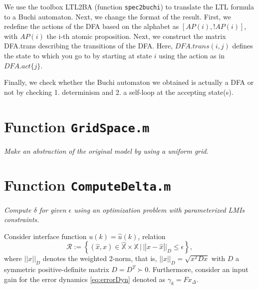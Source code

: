 \documentclass[10pt, onecolumn]{IEEEconf}%
\theoremstyle{definition}
\begin{document}
We use the toolbox LTL2BA (function \texttt{spec2buchi}) to translate the LTL formula to a Buchi automaton. Next, we change the format of the result. First, we redefine the actions of the DFA based on the alphabet as $[AP(i), !AP(i)]$, with $AP(i)$ the i-th atomic proposition. Next, we construct the matrix DFA.trans describing the transitions of the DFA. Here, $DFA.trans(i,j)$ defines the state to which you go to by starting at state $i$ using the action as in $DFA.act\{j\}$. 

Finally, we check whether the Buchi automaton we obtained is actually a DFA or not by checking 1. determinism and 2. a self-loop at the accepting state(s). 

\section*{Function \texttt{GridSpace.m}}
\textit{Make an abstraction of the original model by using a uniform grid.} \medskip


\section*{Function \texttt{ComputeDelta.m}}
\textit{Compute $\delta$ for given $\epsilon$ using an optimization problem with parameterized LMIs constraints.} \medskip

Consider interface function $u(k)=\hat{u}(k)$, relation 
\begin{equation}
\mathscr{R}:=\left\{(\hat{x},x)\in\mathbb{\hat{X}}\times \mathbb{X}\,|\, ||x-\hat x||_D \leq \epsilon \right\},
    \label{eq:simrel}
\end{equation}
 where $||x||_D$ denotes the weighted 2-norm, that is, $||x||_D = \sqrt{x^TDx}$  with $D$ a symmetric positive-definite matrix  $D=D^T \succ 0$. Furthermore, consider an input gain for the error dynamics \eqref{eq:errorDyn} denoted as $\gamma_k = Fx_\Delta$.
\end{document}
